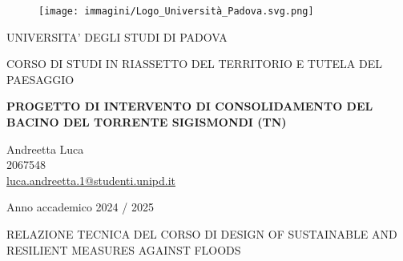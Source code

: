 \begin{figure}[H]\centering
    \texttt{[image: immagini/Logo\_Università\_Padova.svg.png]}
\end{figure}
\begin{center}

{\Large UNIVERSITA' DEGLI STUDI DI PADOVA }\\
  \vspace{0.4 cm}
  
{\Large CORSO DI STUDI IN RIASSETTO DEL TERRITORIO E TUTELA DEL PAESAGGIO } \\ 
    \vspace{0.4 cm}
    
    \vspace{1 cm}
{\huge \textbf{PROGETTO DI INTERVENTO DI CONSOLIDAMENTO DEL BACINO DEL TORRENTE SIGISMONDI (TN)} }
\vspace{0.75 cm}

\normalsize
\end{center}

{\Large \begin{center}
Andreetta Luca \\
2067548 \\
\href{mailto:luca.andreetta.1@studenti.unipd.it}{luca.andreetta.1@studenti.unipd.it}
\end{center}
\vspace{1 cm}

\thispagestyle{empty}
\begin{center}
	Anno accademico 2024 / 2025
\end{center}

\vspace{2 cm}
\begin{center}
    RELAZIONE TECNICA DEL CORSO DI DESIGN OF SUSTAINABLE AND RESILIENT MEASURES AGAINST FLOODS 
\end{center}
}

\newpage